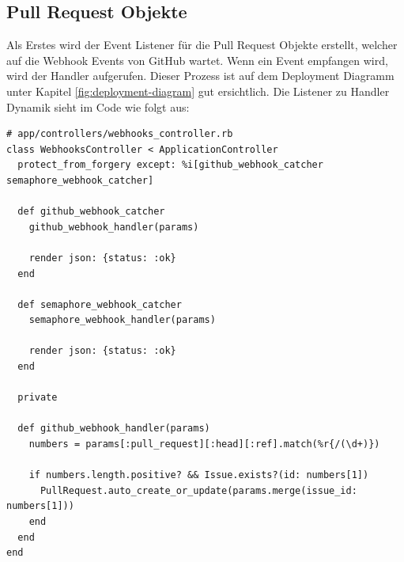 \subsection{Pull Request Objekte}
Als Erstes wird der Event Listener für die Pull Request Objekte erstellt, welcher auf die Webhook Events
von GitHub wartet. Wenn ein Event empfangen wird, wird der Handler aufgerufen. Dieser Prozess ist auf dem Deployment
Diagramm unter Kapitel \ref{fig:deployment-diagram} gut ersichtlich. \newline
Die Listener zu Handler Dynamik sieht im Code wie folgt aus:
\begin{codebox}[]
  \begin{verbatim}
# app/controllers/webhooks_controller.rb
class WebhooksController < ApplicationController
  protect_from_forgery except: %i[github_webhook_catcher semaphore_webhook_catcher]

  def github_webhook_catcher
    github_webhook_handler(params)

    render json: {status: :ok}
  end

  def semaphore_webhook_catcher
    semaphore_webhook_handler(params)

    render json: {status: :ok}
  end

  private

  def github_webhook_handler(params)
    numbers = params[:pull_request][:head][:ref].match(%r{/(\d+)})

    if numbers.length.positive? && Issue.exists?(id: numbers[1])
      PullRequest.auto_create_or_update(params.merge(issue_id: numbers[1]))
    end
  end
end
  \end{verbatim}
\end{codebox}

